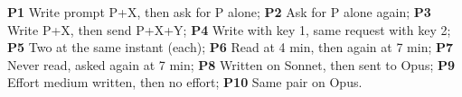 \textbf{P1} Write prompt P+X, then ask for P alone; \textbf{P2} Ask for P alone again; \textbf{P3} Write P+X, then send P+X+Y; \textbf{P4} Write with key 1, same request with key 2; \textbf{P5} Two at the same instant (each); \textbf{P6} Read at 4 min, then again at 7 min; \textbf{P7} Never read, asked again at 7 min; \textbf{P8} Written on Sonnet, then sent to Opus; \textbf{P9} Effort medium written, then no effort; \textbf{P10} Same pair on Opus.
